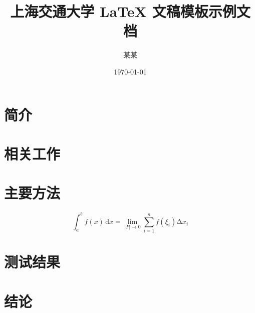 \documentclass{sjtuarticle}
\title{上海交通大学 \LaTeX{} 文稿模板示例文档}
\author{某\quad{}某}
\date{\today}
\begin{document}
\maketitle

\begin{abstract}
  \zhlipsum[1]
\end{abstract}

\section{简介}

\zhlipsum[2]

\section{相关工作}

\zhlipsum[3]

\section{主要方法}

\zhlipsum[4-5]

\begin{equation}
  \int_{a}^b f(x)\,\mathrm{d}x=\lim_{|P|\rightarrow 0}\sum_{i=1}^n f(\xi_i)\increment x_i
\end{equation}

\section{测试结果}

\zhlipsum[6]

\section{结论}

\zhlipsum[7]

\nocite{*}
\printbibliography[heading=bibintoc]
\end{document}
